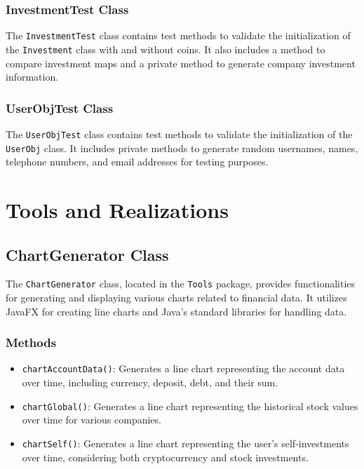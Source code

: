 \documentclass{article}
\begin{document}
\subsubsection{InvestmentTest Class}

The \texttt{InvestmentTest} class contains test methods to validate the initialization of the \texttt{Investment} class with and without coins. It also includes a method to compare investment maps and a private method to generate company investment information.

\subsubsection{UserObjTest Class}

The \texttt{UserObjTest} class contains test methods to validate the initialization of the \texttt{UserObj} class. It includes private methods to generate random usernames, names, telephone numbers, and email addresses for testing purposes.

\newpage
\section{Tools and Realizations}\label{tools}

\subsection{ChartGenerator Class}\label{chart-generator}

The \texttt{ChartGenerator} class, located in the \texttt{Tools} package, provides functionalities for generating and displaying various charts related to financial data. It utilizes JavaFX for creating line charts and Java's standard libraries for handling data.

\subsubsection{Methods}

\begin{itemize}
    \item \texttt{chartAccountData()}: Generates a line chart representing the account data over time, including currency, deposit, debt, and their sum.
    
    \item \texttt{chartGlobal()}: Generates a line chart representing the historical stock values over time for various companies.
    
    \item \texttt{chartSelf()}: Generates a line chart representing the user's self-investments over time, considering both cryptocurrency and stock investments.
\end{itemize}
\end{document}
